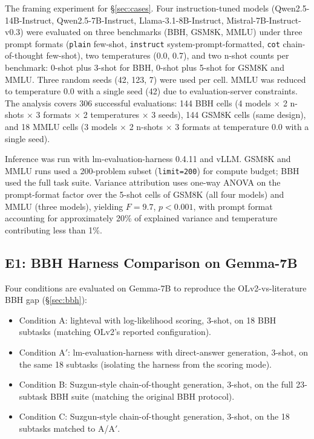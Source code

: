 \documentclass[11pt]{article}
\begin{document}
The framing experiment for \S\ref{sec:cases}. Four instruction-tuned
models (Qwen2.5-14B-Instruct, Qwen2.5-7B-Instruct, Llama-3.1-8B-Instruct,
Mistral-7B-Instruct-v0.3) were evaluated on three benchmarks (BBH, GSM8K,
MMLU) under three prompt formats (\texttt{plain} few-shot,
\texttt{instruct} system-prompt-formatted, \texttt{cot} chain-of-thought
few-shot), two temperatures (0.0, 0.7), and two n-shot counts per
benchmark: 0-shot plus 3-shot for BBH, 0-shot plus 5-shot for GSM8K and
MMLU. Three random seeds (42, 123, 7) were used per cell. MMLU was
reduced to temperature 0.0 with a single seed (42) due to
evaluation-server constraints. The analysis covers 306 successful evaluations:
144 BBH cells (4 models $\times$ 2 n-shots $\times$ 3 formats $\times$ 2
temperatures $\times$ 3 seeds), 144 GSM8K cells (same design), and 18
MMLU cells (3 models $\times$ 2 n-shots $\times$ 3 formats at temperature
0.0 with a single seed).

Inference was run with lm-evaluation-harness 0.4.11 and vLLM. GSM8K and
MMLU runs used a 200-problem subset (\texttt{limit=200}) for compute
budget; BBH used the full task suite. Variance attribution uses one-way
ANOVA on the prompt-format factor over the 5-shot cells of GSM8K (all
four models) and MMLU (three models), yielding $F = 9.7$, $p < 0.001$,
with prompt format accounting for approximately 20\% of explained variance
and temperature contributing less than 1\%.



\subsection{E1: BBH Harness Comparison on Gemma-7B}
\label{app:exp-e1}

Four conditions are evaluated on Gemma-7B to reproduce the OLv2-vs-literature BBH gap (§\ref{sec:bbh}):

\begin{itemize}
\item Condition A: lighteval with log-likelihood scoring, 3-shot, on 18
  BBH subtasks (matching OLv2's reported configuration).
\item Condition A$'$: lm-evaluation-harness with direct-answer generation,
  3-shot, on the same 18 subtasks (isolating the harness from the
  scoring mode).
\item Condition B: Suzgun-style chain-of-thought generation, 3-shot, on
  the full 23-subtask BBH suite (matching the original BBH protocol).
\item Condition C: Suzgun-style chain-of-thought generation, 3-shot, on
  the 18 subtasks matched to A/A$'$.
\end{itemize}
\end{document}
